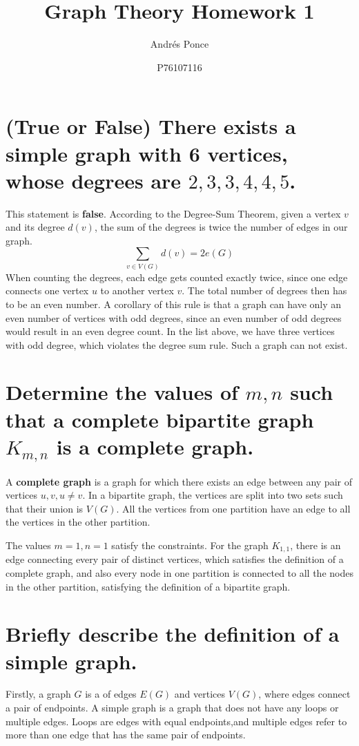 \documentclass{article}
\title{Graph Theory Homework 1}
\author{Andr\'es Ponce \\
\and
P76107116
}
\begin{document}
\maketitle
\section{(True or False) There exists a simple graph with 6 vertices, whose degrees are $2,3,3,4,4,5$. }
This statement is \textbf{false}.
According to the Degree-Sum Theorem, given a vertex $v$ and its degree $d(v)$, the sum of the degrees is 
twice the number of edges in our graph.
	\begin{equation} 
		\label{eq:DSF}
		\sum_{v\in V(G)} d(v) = 2e(G)
	\end{equation}
When counting the degrees, each edge gets counted exactly twice, since one edge connects one vertex $u$ to another vertex $v$.
The total number of degrees then has to be an even number.
A corollary of this rule is that a graph can have only an even number of vertices with odd degrees, since an even number of odd degrees 
would result in an even degree count.
In the list above, we have three vertices with odd degree, which violates the degree sum rule. 
Such a graph can not exist.

\section{Determine the values of $m,n$ such that a complete bipartite graph $K_{m,n}$ is a complete graph.}
A \textbf{complete graph} is a graph for which there exists an edge between any pair of vertices $u, v, u\neq v$.
In a bipartite graph, the vertices are split into two sets such that their union is $V(G)$.
All the vertices from one partition have an edge to all the vertices in the other partition.

The values $m=1, n=1$ satisfy the constraints.
For the graph $K_{1,1}$, there is an edge connecting every pair of distinct vertices, which satisfies the definition of a complete graph,
and also every node in one partition is connected to all the nodes in the other partition, satisfying the definition of a bipartite graph.

\section{Briefly describe the definition of a simple graph.}
Firstly, a graph $G$ is a of edges $E(G)$ and vertices $V(G)$, where edges connect a pair of endpoints.
A simple graph is a graph that does not have any loops or multiple edges.
Loops are edges with equal endpoints,and multiple edges refer to more than one edge that has the same pair of 
endpoints.
\end{document}
